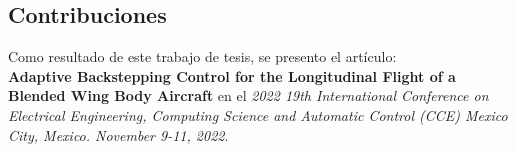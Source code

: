 \subsection{Contribuciones}
Como resultado de este trabajo de tesis, se presento el artículo:\\ \textbf{Adaptive Backstepping Control for the Longitudinal Flight of a Blended Wing Body Aircraft} en el
\textit{2022 19th International Conference on Electrical Engineering, Computing Science and Automatic Control (CCE) Mexico City, Mexico. November 9-11, 2022}. 







